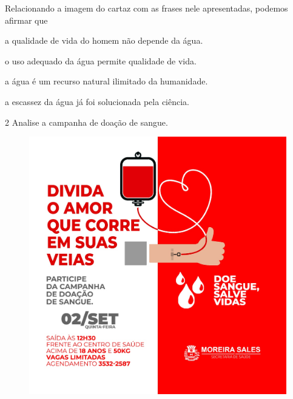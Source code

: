 


Relacionando a imagem do cartaz com as frases nele apresentadas, podemos
afirmar que 

\begin{escolha}
\item a qualidade de vida do homem não depende da água.

\item o uso adequado da água permite qualidade de vida.

\item a água é um recurso natural ilimitado da humanidade.

\item a escassez da água já foi solucionada pela ciência.
\end{escolha}

\pagebreak
\num{2} Analise a campanha de doação de sangue.

\begin{figure}[htpb!]
\centering
\includegraphics[width=\textwidth]{media/image18.jpeg}
\end{figure}

